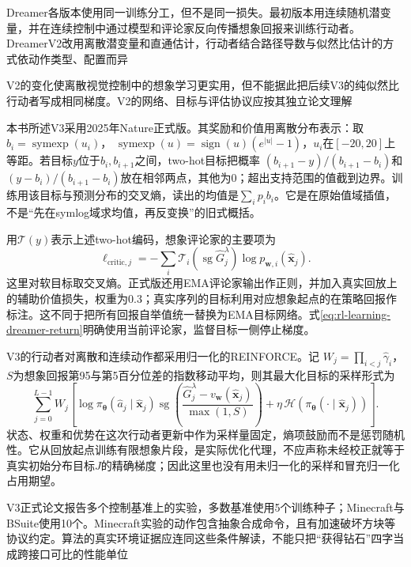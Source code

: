 Dreamer各版本使用同一训练分工，但不是同一损失。最初版本用连续随机潜变量，并在连续控制中通过模型和评论家反向传播想象回报来训练行动者。DreamerV2改用离散潜变量和直通估计，行动者结合路径导数与似然比估计的方式依动作类型、配置而异

V2的变化使离散视觉控制中的想象学习更实用，但不能据此把后续V3的纯似然比行动者写成相同梯度。V2的网络、目标与评估协议应按其独立论文理解

本书所述V3采用2025年Nature正式版。其奖励和价值用离散分布表示：取
$b_i=\operatorname{symexp}(u_i)$，
$\operatorname{symexp}(u)=\operatorname{sign}(u)(e^{|u|}-1)$，$u_i$在$[-20,20]$上等距。若目标$y$位于$b_i,b_{i+1}$之间，two-hot目标把概率
$(b_{i+1}-y)/(b_{i+1}-b_i)$和
$(y-b_i)/(b_{i+1}-b_i)$放在相邻两点，其他为0；超出支持范围的值截到边界。训练用该目标与预测分布的交叉熵，读出的均值是$\sum_i p_i b_i$。它是在原始值域插值，不是“先在symlog域求均值，再反变换”的旧式概括。

用$\mathcal T(y)$表示上述two-hot编码，想象评论家的主要项为
\[
  \ell_{\mathrm{critic},j}
    =-\sum_i\mathcal T_i(\operatorname{sg}\widehat G_j^\lambda)
                   \log p_{\bm w,i}(\widehat{\bm x}_j).
\]
这里对软目标取交叉熵。正式版还用EMA评论家输出作正则，并加入真实回放上的辅助价值损失，权重为$0.3$；真实序列的目标利用对应想象起点的在策略回报作标注。这不同于把所有回报自举值统一替换为EMA目标网络。式\eqref{eq:rl-learning-dreamer-return}明确使用当前评论家，监督目标一侧停止梯度。

V3的行动者对离散和连续动作都采用归一化的REINFORCE。记
$W_j=\prod_{i<j}\widehat\gamma_i$，$S$为想象回报第95与第5百分位差的指数移动平均，则其最大化目标的采样形式为
\begin{equation}
 \sum_{j=0}^{L-1}W_j\left[
   \log\pi_{\bm\theta}(\widehat a_j\mid\widehat{\bm x}_j)
   \operatorname{sg}\left(
       \frac{\widehat G_j^\lambda-v_{\bm w}(\widehat{\bm x}_j)}
            {\max(1,S)}\right)
     +\eta\,\mathcal H(\pi_{\bm\theta}(\cdot\mid\widehat{\bm x}_j))
                       \right].
 \label{eq:rl-learning-dreamer-actor}
\end{equation}
状态、权重和优势在这次行动者更新中作为采样量固定，熵项鼓励而不是惩罚随机性。它从回放起点训练有限想象片段，是实际优化代理，不应声称未经校正就等于真实初始分布目标$J$的精确梯度；因此这里也没有用未归一化的采样和冒充归一化占用期望。

V3正式论文报告多个控制基准上的实验，多数基准使用5个训练种子；Minecraft与BSuite使用10个。Minecraft实验的动作包含抽象合成命令，且有加速破坏方块等协议约定。算法的真实环境证据应连同这些条件解读，不能只把“获得钻石”四字当成跨接口可比的性能单位

